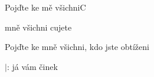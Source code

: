 \begin{song}{Pojďte ke mě všichni}{C}{}
\begin{SBChorus*}
  mně všichni    cujete  

Pojďte ke mně všichni, kdo jste obtíženi

$|$:   já         vám  činek  
\end{SBChorus*}
\end{song}

\pagebreak
